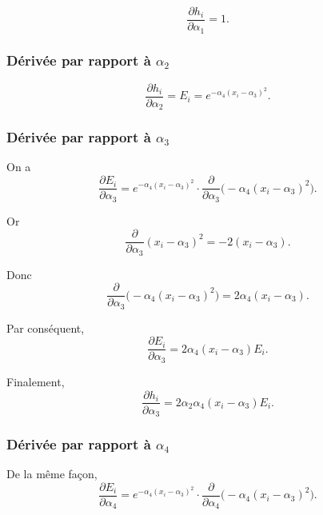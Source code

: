 \documentclass[a4paper,12pt]{article}
\begin{document}
	\begin{equation}
	\frac{\partial h_i}{\partial \alpha_1}=1.
	\end{equation}
	
	\subsubsection{Dérivée par rapport à \texorpdfstring{$\alpha_2$}{a2}}
	
	\begin{equation}
	\frac{\partial h_i}{\partial \alpha_2}=E_i=e^{-\alpha_4(x_i-\alpha_3)^2}.
	\end{equation}
	
	\subsubsection{Dérivée par rapport à \texorpdfstring{$\alpha_3$}{a3}}
	
	On a
	\begin{equation}
	\frac{\partial E_i}{\partial \alpha_3}
	=
	e^{-\alpha_4(x_i-\alpha_3)^2}
	\cdot
	\frac{\partial}{\partial \alpha_3}\big(-\alpha_4(x_i-\alpha_3)^2\big).
	\end{equation}
	
	Or
	\begin{equation}
	\frac{\partial}{\partial \alpha_3}(x_i-\alpha_3)^2
	=
	-2(x_i-\alpha_3).
	\end{equation}
	
	Donc
	\begin{equation}
	\frac{\partial}{\partial \alpha_3}\big(-\alpha_4(x_i-\alpha_3)^2\big)
	=
	2\alpha_4(x_i-\alpha_3).
	\end{equation}
	
	Par conséquent,
	\begin{equation}
	\frac{\partial E_i}{\partial \alpha_3}
	=
	2\alpha_4(x_i-\alpha_3)E_i.
	\end{equation}
	
	Finalement,
	\begin{equation}
	\frac{\partial h_i}{\partial \alpha_3}
	=
	2\alpha_2\alpha_4(x_i-\alpha_3)E_i.
	\end{equation}
	
	\subsubsection{Dérivée par rapport à \texorpdfstring{$\alpha_4$}{a4}}
	
	De la même façon,
	\begin{equation}
	\frac{\partial E_i}{\partial \alpha_4}
	=
	e^{-\alpha_4(x_i-\alpha_3)^2}
	\cdot
	\frac{\partial}{\partial \alpha_4}\big(-\alpha_4(x_i-\alpha_3)^2\big).
	\end{equation}
	
\end{document}
